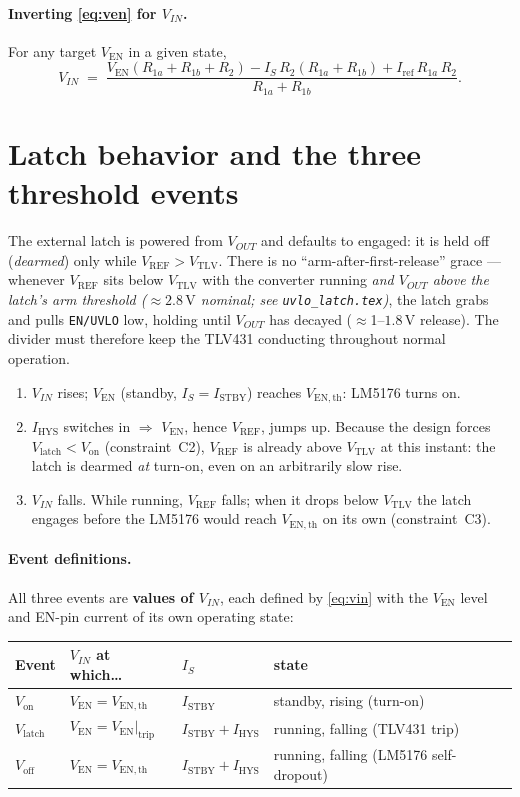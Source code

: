 \documentclass[11pt]{article}
\newcommand{\volt}{\mathrm{V}}\newcommand{\ampere}{\mathrm{A}}
\newcommand{\SI}[2]{\ensuremath{#1\,#2}}
\newcommand{\Ven}{V_{\mathrm{EN}}}
\newcommand{\Vref}{V_{\mathrm{REF}}}
\newcommand{\Vtlv}{V_{\mathrm{TLV}}}
\newcommand{\Vth}{V_{\mathrm{EN,th}}}
\newcommand{\Iref}{I_{\mathrm{ref}}}
\newcommand{\Istby}{I_{\mathrm{STBY}}}
\newcommand{\Ihys}{I_{\mathrm{HYS}}}
\newcommand{\Rone}{R_{1a}}
\newcommand{\Rtwo}{R_{1b}}
\newcommand{\Rt}{R_{2}}
\newcommand{\Von}{V_{\mathrm{on}}}
\newcommand{\Voff}{V_{\mathrm{off}}}
\newcommand{\Vlatch}{V_{\mathrm{latch}}}
\begin{document}
\paragraph{Inverting \eqref{eq:ven} for $V_{IN}$.} For any target $\Ven$ in a given state,
\begin{equation}
V_{IN}\;=\;\frac{\Ven(\Rone+\Rtwo+\Rt)-I_S\,\Rt(\Rone+\Rtwo)+\Iref\,\Rone\,\Rt}{\Rone+\Rtwo}.
\label{eq:vin}
\end{equation}

\section{Latch behavior and the three threshold events}\label{sec:events}

The external latch is powered from $V_{OUT}$ and defaults to engaged: it is
held off (\emph{dearmed}) only while $\Vref>\Vtlv$. There is no
``arm-after-first-release'' grace --- whenever $\Vref$ sits below $\Vtlv$ with
the converter running \emph{and $V_{OUT}$ above the latch's arm threshold
($\approx\SI{2.8}{\volt}$ nominal; see \texttt{uvlo\_latch.tex})}, the latch
grabs and pulls \texttt{EN/UVLO} low, holding until $V_{OUT}$ has decayed
($\approx$1--\SI{1.8}{\volt} release). The divider must therefore keep the
TLV431 conducting throughout normal operation.

\begin{enumerate}[nosep]
\item $V_{IN}$ rises; $\Ven$ (standby, $I_S=\Istby$) reaches $\Vth$: LM5176 turns on.
\item $\Ihys$ switches in $\Rightarrow$ $\Ven$, hence $\Vref$, jumps up. Because the
design forces $\Vlatch<\Von$ (constraint~C2), $\Vref$ is already above $\Vtlv$ at
this instant: the latch is dearmed \emph{at} turn-on, even on an arbitrarily slow rise.
\item $V_{IN}$ falls. While running, $\Vref$ falls; when it drops below $\Vtlv$
the latch engages before the LM5176 would reach $\Vth$ on its own (constraint~C3).
\end{enumerate}

\paragraph{Event definitions.} All three events are \textbf{values of $V_{IN}$},
each defined by \eqref{eq:vin} with the $\Ven$ level and EN-pin current of its
own operating state:

\begin{center}
\begin{tabular}{llll}
\toprule
Event & $V_{IN}$ at which\ldots & $I_S$ & state \\
\midrule
$\Von$    & $\Ven=\Vth$ & $\Istby$ & standby, rising (turn-on) \\
$\Vlatch$ & $\Ven=\Ven|_{\mathrm{trip}}$ & $\Istby+\Ihys$ & running, falling (TLV431 trip) \\
$\Voff$   & $\Ven=\Vth$ & $\Istby+\Ihys$ & running, falling (LM5176 self-dropout) \\
\bottomrule
\end{tabular}
\end{center}
\end{document}
